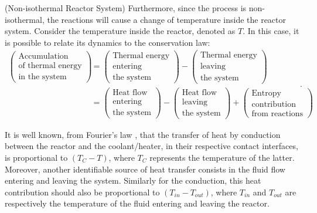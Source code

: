 \documentclass[a4paper,11pt]{book}
\numberwithin{figure}{chapter}
\numberwithin{equation}{chapter}
\numberwithin{table}{chapter}
\theoremstyle{definition}
\newtheorem{example}{Example}[chapter]
\newcounter{boxed-theorem}
\newcounter{boxed-lemma}
\newcounter{boxed-definition}
\newcounter{boxed-example}
\newenvironment{boxed-example}[1]
{\colorlet{shadecolor}{pastelRed!15} \begin{shaded} \begin{example}{#1}}
{\end{example} \end{shaded}}
\begin{document}
\begin{boxed-example}{(Non-isothermal Reactor System)}
    Furthermore, since the process is non-isothermal, the reactions will cause a change of temperature inside the reactor system. Consider the temperature inside the reactor, denoted as $T$. In this case, it is possible to relate its dynamics to the conservation law:  
    \begin{equation}
    \begin{split}
        \begin{pmatrix}
            \text{Accumulation} \\ \text{of thermal energy} \\ \text{in the system}
        \end{pmatrix} &= \begin{pmatrix}
            \text{Thermal energy} \\ \text{entering} \\ \text{the system}
        \end{pmatrix} - \begin{pmatrix}
            \text{Thermal energy} \\ \text{leaving} \\ \text{the system}
        \end{pmatrix} \\
         &= \begin{pmatrix}
            \text{Heat flow} \\ \text{entering} \\ \text{the system}
        \end{pmatrix} - \begin{pmatrix}
            \text{Heat flow} \\ \text{leaving} \\ \text{the system}
        \end{pmatrix} + \begin{pmatrix}
            \text{Entropy} \\ \text{contribution} \\ \text{from reactions}
        \end{pmatrix}
    \end{split}
    .\end{equation}
    
    It is well known, from Fourier's law \cite{Bergman:2018}, that the transfer of heat by conduction between the reactor and the coolant/heater, in their respective contact interfaces, is proportional to $(T_C - T)$, where $T_C$ represents the temperature of the latter. Moreover, another identifiable source of heat transfer consists in the fluid flow entering and leaving the system. Similarly for the conduction, this heat contribution should also be proportional to $(T_{in} - T_{out})$, where $T_{in}$ and $T_{out}$ are respectively the temperature of the fluid entering and leaving the reactor.
    

\end{boxed-example}
\end{document}
